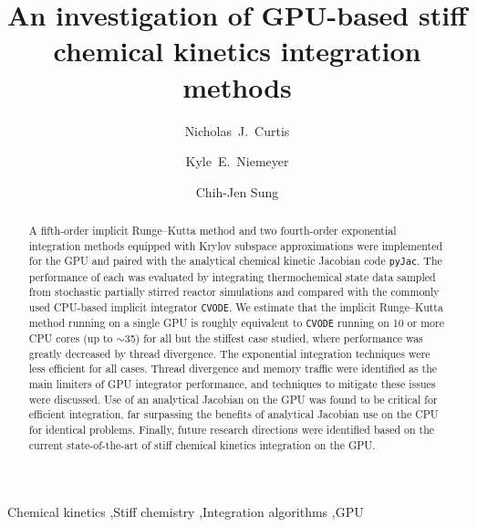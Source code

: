 \documentclass[final,twocolumn]{elsarticle}
\begin{document}
\else
\ifmeasure
\small
\baselineskip 10pt
\fi
\begin{frontmatter}

\title{An investigation of GPU-based stiff chemical kinetics integration methods}

\author[uconn]{Nicholas~J.\ Curtis}
\author[osu]{Kyle~E.\ Niemeyer}
\author[uconn]{Chih-Jen Sung}

\address[uconn]{Department of Mechanical Engineering\\
  University of Connecticut, Storrs, CT, 06269, USA}
\address[osu]{School of Mechanical, Industrial, and Manufacturing Engineering\\
  Oregon State University, Corvallis, OR 97331, USA}
  

\begin{abstract}
A fifth-order implicit Runge--Kutta method and two fourth-order exponential integration methods equipped with Krylov subspace approximations were implemented for the GPU and paired with the analytical chemical kinetic Jacobian code \texttt{pyJac}.
The performance of each was evaluated by integrating thermochemical state data sampled from stochastic partially stirred reactor simulations and compared with the commonly used CPU-based implicit integrator \texttt{CVODE}.
We estimate that the implicit Runge--Kutta method running on a single GPU is roughly equivalent to \texttt{CVODE} running on \num{10} or more CPU cores (up to $\sim$\num{35}) for all but the stiffest case studied, where performance was greatly decreased by thread divergence.
The exponential integration techniques were less efficient for all cases.
Thread divergence and memory traffic were identified as the main limiters of GPU integrator performance, and techniques to mitigate these issues were discussed.
Use of an analytical Jacobian on the GPU was found to be critical for efficient integration, far surpassing the benefits of analytical Jacobian use on the CPU for identical problems.
Finally, future research directions were identified based on the current state-of-the-art of stiff chemical kinetics integration on the GPU.
\end{abstract}

\begin{keyword}
 Chemical kinetics \sep Stiff chemistry \sep Integration algorithms \sep GPU
\end{keyword}

\end{frontmatter}
\end{document}
